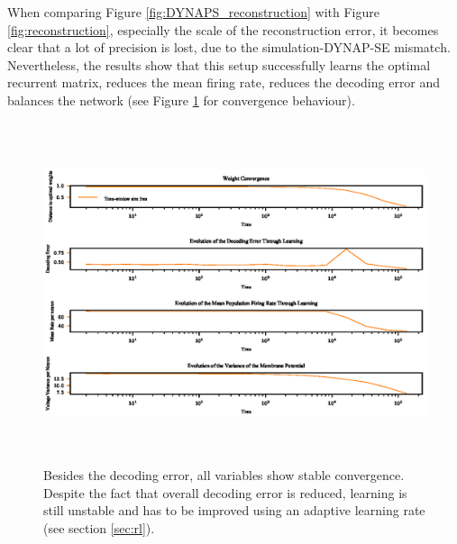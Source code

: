 \documentclass[twoside,11pt]{article}
\begin{document}
When comparing Figure \ref{fig:DYNAPS_reconstruction} with Figure \ref{fig:reconstruction},
especially the scale of the reconstruction error, it
becomes clear that a lot of precision is lost, due to the simulation-DYNAP-SE mismatch.
Nevertheless, the results show that this setup successfully learns the optimal recurrent matrix,
reduces the mean firing rate, reduces the decoding error and balances the network
(see Figure \ref{fig:DYNAPS_convergence} for convergence behaviour).

\begin{figure}[!htb]
  \centering
  \includegraphics[width = \columnwidth, height=10cm]{figures/DYNAPS_convergence.eps}
  \caption{Besides the decoding error, all variables show stable convergence. Despite the fact that
  overall decoding error is reduced, learning is still unstable and has to be improved using
  an adaptive learning rate (see section \ref{sec:rl}).}
  \label{fig:DYNAPS_convergence}
\end{figure}

\newpage
\end{document}
